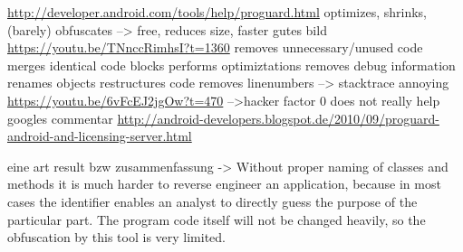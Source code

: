 \url{http://developer.android.com/tools/help/proguard.html}\newline
optimizes, shrinks, (barely) obfuscates --> free, reduces size, faster\newline
gutes bild \url{https://youtu.be/TNnccRimhsI?t=1360}\newline
removes unnecessary/unused code\newline
merges identical code blocks\newline
performs optimiztations\newline
removes debug information\newline
renames objects\newline
restructures code\newline
removes linenumbers --> stacktrace annoying\newline
\url{https://youtu.be/6vFcEJ2jgOw?t=470}\newline
-->hacker factor 0\newline
does not really help\newline
googles commentar \url{http://android-developers.blogspot.de/2010/09/proguard-android-and-licensing-server.html}\newline

eine art result bzw zusammenfassung -> Without proper naming of classes and methods it is much harder to reverse engineer an application, because in most cases the identifier enables an analyst to directly guess the purpose of the particular part. The program code itself will not be changed heavily, so the obfuscation by this tool is very limited.
